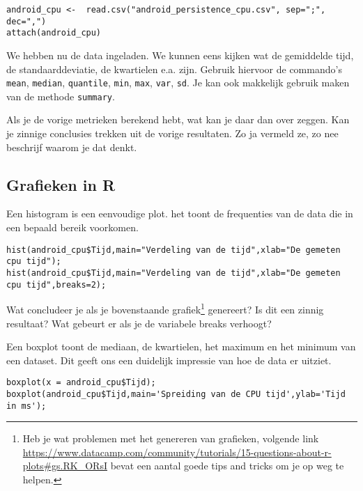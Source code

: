 \begin{lstlisting}
android_cpu <-  read.csv("android_persistence_cpu.csv", sep=";", dec=",")
attach(android_cpu)
\end{lstlisting}

We hebben nu de data ingeladen. We kunnen eens kijken wat de gemiddelde tijd, de standaarddeviatie, de kwartielen e.a. zijn. Gebruik hiervoor de commando's \texttt{mean}, \texttt{median}, \texttt{quantile}, \texttt{min}, \texttt{max}, \texttt{var}, \texttt{sd}. Je kan ook makkelijk gebruik maken van de methode \texttt{summary}.

\begin{exercise}
	Als je de vorige metrieken berekend hebt, wat kan je daar dan over zeggen. Kan je zinnige conclusies trekken uit de vorige resultaten. Zo ja vermeld ze, zo nee beschrijf waarom je dat denkt.
\end{exercise}

\subsection{Grafieken in R}

Een histogram is een eenvoudige plot. het toont de frequenties van de data die in een bepaald bereik voorkomen. 

\begin{lstlisting}
hist(android_cpu$Tijd,main="Verdeling van de tijd",xlab="De gemeten cpu tijd");
hist(android_cpu$Tijd,main="Verdeling van de tijd",xlab="De gemeten cpu tijd",breaks=2);
\end{lstlisting}
\begin{exercise}
	Wat concludeer je als je bovenstaande grafiek\footnote{Heb je wat problemen met het genereren van grafieken, volgende link \url{https://www.datacamp.com/community/tutorials/15-questions-about-r-plots\#gs.RK_ORsI} bevat een aantal goede tips and tricks om je op weg te helpen.} genereert? Is dit een zinnig resultaat? Wat gebeurt er als je de variabele breaks verhoogt?
\end{exercise}

Een boxplot toont de mediaan, de kwartielen, het maximum en het minimum van een dataset. Dit geeft ons een duidelijk impressie van hoe de data er uitziet.

\begin{lstlisting}
boxplot(x = android_cpu$Tijd);
boxplot(android_cpu$Tijd,main='Spreiding van de CPU tijd',ylab='Tijd in ms');
\end{lstlisting} 

